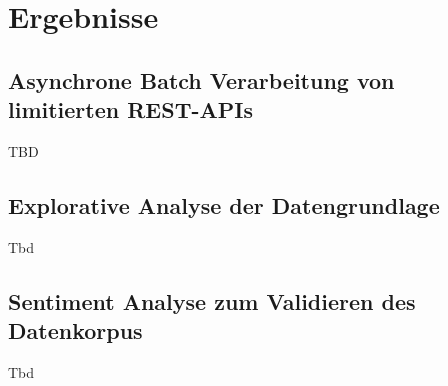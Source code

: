 \newpage
\section{Ergebnisse}

\subsection{Asynchrone Batch Verarbeitung von limitierten REST-APIs}
TBD

\newpage

\subsection{Explorative Analyse der Datengrundlage}
Tbd
\newpage

\subsection{Sentiment Analyse zum Validieren des Datenkorpus}
Tbd
